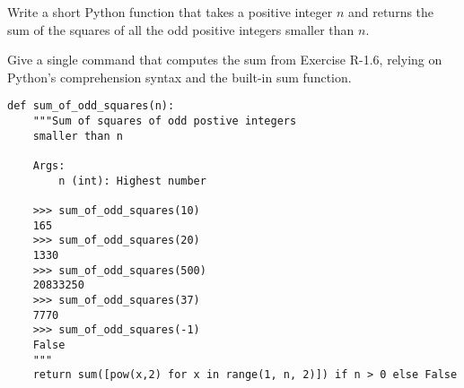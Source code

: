  \label{sssec:ex1_61_7}

Write a short Python function that takes a positive integer $n$ and returns the sum of the squares of all the odd positive integers smaller than $n$.

Give a single command that computes the sum from Exercise R-1.6, relying on Python's comprehension syntax and the built-in sum function.

\begin{lstlisting}[title=Exercise R-1.6 \& R-1.7]
def sum_of_odd_squares(n):
    """Sum of squares of odd postive integers
    smaller than n

    Args:
        n (int): Highest number

    >>> sum_of_odd_squares(10)
    165
    >>> sum_of_odd_squares(20)
    1330
    >>> sum_of_odd_squares(500)
    20833250
    >>> sum_of_odd_squares(37)
    7770
    >>> sum_of_odd_squares(-1)
    False
    """
    return sum([pow(x,2) for x in range(1, n, 2)]) if n > 0 else False
\end{lstlisting}